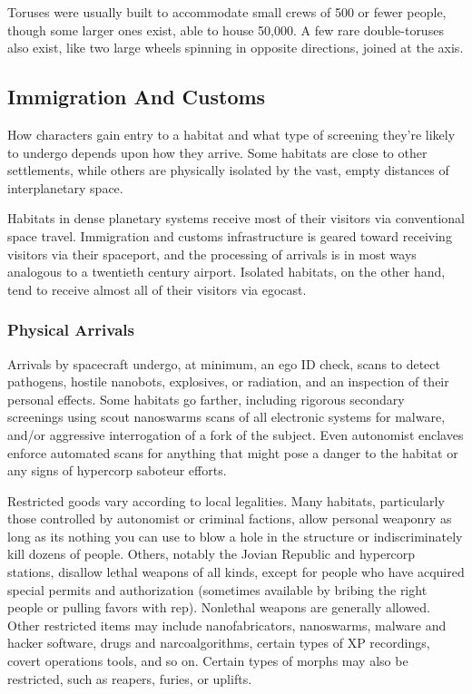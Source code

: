 Toruses were usually built to accommodate small crews of 500 or fewer people, though some larger ones exist, able to house 50,000. A few rare double-toruses also exist, like two large wheels spinning in opposite directions, joined at the axis. 

\subsection{Immigration And Customs} 

How characters gain entry to a habitat and what type of screening they're likely to undergo depends upon how they arrive. Some habitats are close to other settlements, while others are physically isolated by the vast, empty distances of interplanetary space. 

Habitats in dense planetary systems receive most of their visitors via conventional space travel. Immigration and customs infrastructure is geared toward receiving visitors via their spaceport, and the processing of arrivals is in most ways analogous to a twentieth century airport. Isolated habitats, on the other hand, tend to receive almost all of their visitors via egocast. 

\subsubsection{Physical Arrivals} 

Arrivals by spacecraft undergo, at minimum, an ego ID check, scans to detect pathogens, hostile nanobots, explosives, or radiation, and an inspection of their personal effects. Some habitats go farther, including rigorous secondary screenings using scout nanoswarms scans of all electronic systems for malware, and/or aggressive interrogation of a fork of the subject. Even autonomist enclaves enforce automated scans for anything that might pose a danger to the habitat or any signs of hypercorp saboteur efforts. 

Restricted goods vary according to local legalities. Many habitats, particularly those controlled by autonomist or criminal factions, allow personal weaponry as long as its nothing you can use to blow a hole in the structure or indiscriminately kill dozens of people. Others, notably the Jovian Republic and hypercorp stations, disallow lethal weapons of all kinds, except for people who have acquired special permits and authorization (sometimes available by bribing the right people or pulling favors with rep). Nonlethal weapons are generally allowed. Other restricted items may include nanofabricators, nanoswarms, malware and hacker software, drugs and narcoalgorithms, certain types of XP recordings, covert operations tools, and so on. Certain types of morphs may also be restricted, such as reapers, furies, or uplifts. 

